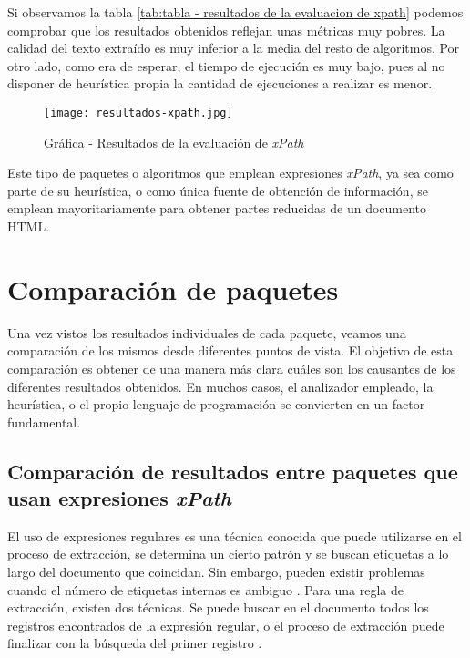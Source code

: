 Si observamos la tabla \ref{tab:tabla - resultados de la evaluacion de xpath} podemos comprobar que los
resultados obtenidos reflejan unas métricas muy pobres. La calidad del texto extraído es muy inferior a la
media del resto de algoritmos. Por otro lado, como era de esperar, el tiempo de ejecución es muy bajo, pues
al no disponer de heurística propia la cantidad de ejecuciones a realizar es menor.

\begin{figure}[tphb]
    \centering
    \texttt{[image: resultados-xpath.jpg]}
    \caption{Gráfica - Resultados de la evaluación de \emph{xPath}}
    \label{img:grafica - resultados de la evaluacion de xpath}
\end{figure}

Este tipo de paquetes o algoritmos que emplean expresiones \emph{xPath}, ya sea como parte de su heurística,
o como única fuente de obtención de información, se emplean mayoritariamente para obtener partes reducidas
de un documento HTML.

\section{Comparación de paquetes}
\label{sec:comparacion de paquetes}

Una vez vistos los resultados individuales de cada paquete, veamos una comparación de los mismos desde
diferentes puntos de vista. El objetivo de esta comparación es obtener de una manera más clara cuáles son
los causantes de los diferentes resultados obtenidos. En muchos casos, el analizador empleado, la heurística,
o el propio lenguaje de programación se convierten en un factor fundamental.

\subsection{Comparación de resultados entre paquetes que usan expresiones \emph{xPath}}
\label{subsec:comparacion de resultados entre paquetes que usan expresiones xpath}

El uso de expresiones regulares es una técnica conocida que puede utilizarse en el proceso de extracción,
se determina un cierto patrón y se buscan etiquetas a lo largo del documento que coincidan. Sin embargo,
pueden existir problemas cuando el número de etiquetas internas es ambiguo \cite{uzun}. Para una regla de 
extracción, existen dos técnicas. Se puede buscar en el documento todos los registros encontrados de la 
expresión regular, o el proceso de extracción puede finalizar con la búsqueda del primer registro \cite{regex}.


